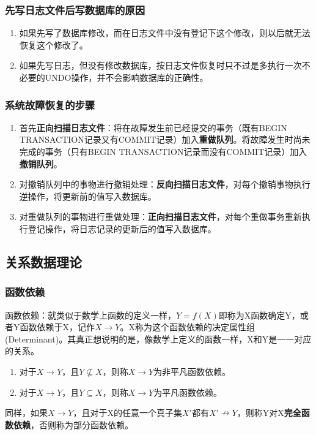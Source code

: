 \documentclass[chapter.computer_science.tex]{subfiles}
\begin{document}
\subsubsection{先写日志文件后写数据库的原因}
\begin{enumerate}
    \item 如果先写了数据库修改，而在日志文件中没有登记下这个修改，则以后就无法恢复这个修改了。
    \item 如果先写日志，但没有修改数据库，按日志文件恢复时只不过是多执行一次不必要的UNDO操作，并不会影响数据库的正确性。
\end{enumerate}
\subsubsection{系统故障恢复的步骤}
\begin{enumerate}
    \item 首先{\bfseries 正向扫描日志文件}：将在故障发生前已经提交的事务（既有BEGIN TRANSACTION记录又有COMMIT记录）加入{\bfseries 重做队列}。将故障发生时尚未完成的事务（只有BEGIN TRANSACTION记录而没有COMMIT记录）加入{\bfseries 撤销队列}。
    \item 对撤销队列中的事物进行撤销处理：{\bfseries 反向扫描日志文件}，对每个撤销事物执行逆操作，将更新前的值写入数据库。
    \item 对重做队列的事物进行重做处理：{\bfseries 正向扫描日志文件}，对每个重做事务重新执行登记操作，将日志记录的更新后的值写入数据库。
\end{enumerate}

\subsection{关系数据理论}
\subsubsection{函数依赖}
函数依赖：就类似于数学上函数的定义一样，$ Y=f(X) $即称为X函数确定Y，或者Y函数依赖于X，记作$ X \rightarrow Y $。X称为这个函数依赖的决定属性组(Determinant)。其真正想说明的是，像数学上定义的函数一样，X和Y是一一对应的关系。\\
\begin{enumerate}
    \item 对于$ X \rightarrow Y $，且$ Y \nsubseteq X $，则称$ X \rightarrow Y $为非平凡函数依赖。
    \item 对于$ X \rightarrow Y $，且$ Y \subseteq X $，则称$ X \rightarrow Y $为平凡函数依赖。
\end{enumerate}
同样，如果$ X \rightarrow Y $，且对于X的任意一个真子集$ X' $都有$ X' \nrightarrow Y $，则称Y对X{\bfseries 完全函数依赖}，否则称为部分函数依赖。
\end{document}
